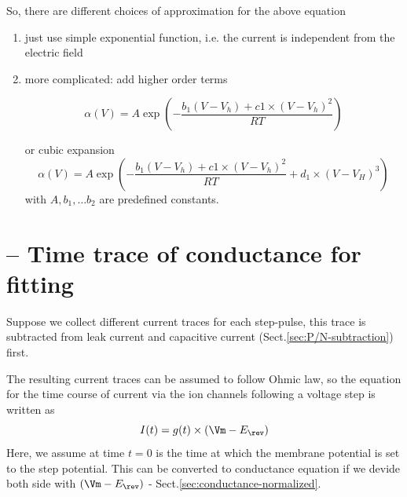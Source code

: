 So, there are different choices of approximation for the above equation
\begin{enumerate}
  \item  just use simple exponential function, i.e. the current is independent
  from the electric field

  \item more complicated: add higher order terms


\begin{equation}
\alpha(V) = A \exp\left(   - \frac{b_1 (V - V_h) + c1 \times (V - V_h)^2}{RT}
\right)
\end{equation}

or cubic expansion
\begin{equation}
\alpha(V) = A \exp\left(   - \frac{b_1 (V - V_h) + c1 \times (V - V_h)^2}{RT} +
d_1 \times (V - V_H)^3 \right)
\end{equation}
with $A, b_1, \ldots b_2$ are predefined constants.
\end{enumerate}

\section{-- Time trace of conductance for fitting}

Suppose we collect different current traces for each step-pulse, this trace is
subtracted from leak current and capacitive current
(Sect.\ref{sec:P/N-subtraction}) first.

The resulting current traces can be assumed to follow Ohmic law, so the
equation for the time course of current via the ion channels
following a voltage step is written as
\begin{equation}
I(t) = g(t) \times (\Vm - E_\rev)
\end{equation}
Here, we assume at time $t=0$ is the time at which the membrane potential is set to the step
potential. This can be converted to conductance equation if we devide both side
with $(\Vm - E_\rev)$ - Sect.\ref{sec:conductance-normalized}.

